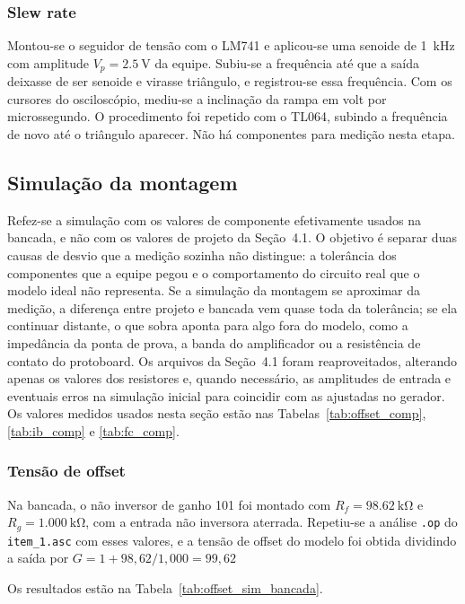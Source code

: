 \documentclass[11pt,a4paper]{article}
\begin{document}
\subsubsection{Slew rate}

Montou-se o seguidor de tensão com o LM741 e aplicou-se uma senoide de \SI{1}{\kilo\hertz} com amplitude $V_p = \SI{2,5}{\volt}$ da equipe. Subiu-se a frequência até que a saída deixasse de ser senoide e virasse triângulo, e registrou-se essa frequência. Com os cursores do osciloscópio, mediu-se a inclinação da rampa em volt por microssegundo. O procedimento foi repetido com o TL064, subindo a frequência de novo até o triângulo aparecer. Não há componentes para medição nesta etapa.

\subsection{Simulação da montagem}

Refez-se a simulação com os valores de componente efetivamente usados na bancada, e não com os valores de projeto da Seção~4.1. O objetivo é separar duas causas de desvio que a medição sozinha não distingue: a tolerância dos componentes que a equipe pegou e o comportamento do circuito real que o modelo ideal não representa. Se a simulação da montagem se aproximar da medição, a diferença entre projeto e bancada vem quase toda da tolerância; se ela continuar distante, o que sobra aponta para algo fora do modelo, como a impedância da ponta de prova, a banda do amplificador ou a resistência de contato do protoboard. Os arquivos da Seção~4.1 foram reaproveitados, alterando apenas os valores dos resistores e, quando necessário, as amplitudes de entrada e eventuais erros na simulação inicial para coincidir com as ajustadas no gerador. Os valores medidos usados nesta seção estão nas Tabelas~\ref{tab:offset_comp}, \ref{tab:ib_comp} e \ref{tab:fc_comp}.

\subsubsection{Tensão de offset}

Na bancada, o não inversor de ganho 101 foi montado com $R_f = \SI{98,62}{\kilo\ohm}$ e $R_g = \SI{1,000}{\kilo\ohm}$, com a entrada não inversora aterrada. Repetiu-se a análise \texttt{.op} do \texttt{item\_1.asc} com esses valores, e a tensão de offset do modelo foi obtida dividindo a saída por $G = 1 + 98{,}62/1{,}000 = 99{,}62$

Os resultados estão na Tabela~\ref{tab:offset_sim_bancada}.
\end{document}
